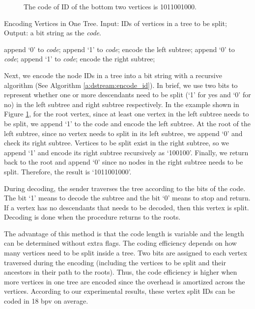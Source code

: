     \begin{figure}
    \centering
    \caption{The code of ID of the bottom two
    vertices is 1011001000. 
    \label{f:dstream:encode_id}}
    \end{figure}
    \begin{algorithm}
    \caption[Encoding Vertices in One Tree.]{Encoding Vertices in One Tree.
    Input: IDs of vertices in a tree to be split;
    Output: a bit string as the \emph{code}.\label{a:dstream:encode_id}}
    \begin{algorithmic}
        \STATE append `0' to \emph{code};
    \ELSE
        \STATE append `1' to \emph{code};
        \STATE encode the left subtree;
    \ENDIF
        \STATE append `0' to \emph{code};
    \ELSE
        \STATE append `1' to \emph{code};
        \STATE encode the right subtree;
    \ENDIF
    \end{algorithmic}
    \end{algorithm}
    Next, we encode the node IDs in a tree into a bit string with 
    a recursive algorithm (See Algorithm \ref{a:dstream:encode_id}).
    In brief, we use two bits to represent whether one or more descendants need
    to be split (`1' for yes and `0' for no)
    in the left subtree and right subtree respectively. 
    In the example shown in Figure \ref{f:dstream:encode_id}, for the root vertex, since at least one vertex
    in the left subtree needs to be split, we append `1' to the code and encode the
    left subtree. At the root of the left subtree, since no vertex needs to split in its left
    subtree, we append `0' and check its right subtree. Vertices to be split exist in the right
    subtree, so we append `1' and encode its right subtree recursively as `100100'. 
    Finally, we return back to the root and append `0' since 
    no nodes in the right subtree needs to be split. 
    Therefore, the result is `1011001000'.
        
    During decoding, the sender traverses the tree according to the bits of the code. 
    The bit `1' means to decode the subtree and the bit `0' means to stop and return.
    If a vertex has no descendants that needs to be decoded, then this vertex is split. 
    Decoding is done when the procedure returns to the roots.
    
    The advantage of this method is that the code length is variable and the 
    length can be determined without extra flags. The coding efficiency depends
    on how many vertices need to be split inside a tree. Two bits
    are assigned to each vertex traversed during the encoding
    (including the vertices to be split and their ancestors in their path
    to the roots). Thus, the code efficiency is higher when more vertices in one tree
    are encoded since the overhead is amortized across the vertices. 
    According to our experimental results, these vertex split IDs can 
    be coded in 18 bpv on average. 


